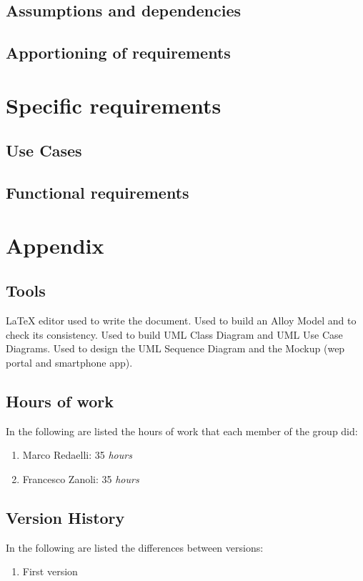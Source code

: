 \documentclass{../Common/Structure/doc_pdf}
\begin{document}
\section{Assumptions and dependencies}

\section{Apportioning of requirements}

\chapter{Specific requirements}


\section{Use Cases}


\section{Functional requirements}




\appendix
\chapter{Appendix}

\section{Tools}
\begin{itemize}
	 \LaTeX{} editor used to write the document.
	 Used to build an Alloy Model and to check its consistency.
	 Used to build UML Class Diagram and UML Use Case Diagrams.
	 Used to design the UML Sequence Diagram and the Mockup (wep portal and smartphone app).

\end{itemize}
\newpage
\section{Hours of work}
In the following are listed the hours of work that each member of the group did:
\begin{enumerate}
	\item Marco Redaelli: 35 \emph{hours}
	\item Francesco Zanoli: 35 \emph{hours}
\end{enumerate}
\newpage
\section{Version History}
In the following are listed the differences between versions:
\begin{enumerate}
	\item First version
\end{enumerate}
\end{document}
